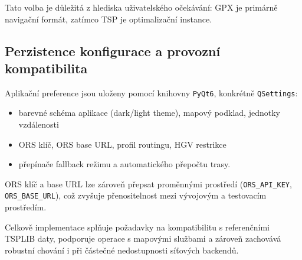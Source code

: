 Tato volba je důležitá z hlediska uživatelského očekávání: GPX je primárně navigační formát, zatímco TSP je optimalizační instance.

\subsection{Perzistence konfigurace a provozní kompatibilita}
Aplikační preference jsou uloženy pomocí knihovny \texttt{PyQt6}, konkrétně \texttt{QSettings}:
\begin{itemize}
    \item barevné schéma aplikace (dark/light theme), mapový podklad, jednotky vzdálenosti
    \item ORS klíč, ORS base URL, profil routingu, HGV restrikce
    \item přepínače fallback režimu a automatického přepočtu trasy.
\end{itemize}

ORS klíč a base URL lze zároveň přepsat proměnnými prostředí (\texttt{ORS\_API\_KEY}, \texttt{ORS\_BASE\_URL}), což zvyšuje přenositelnost mezi vývojovým a testovacím prostředím.

Celkově implementace splňuje požadavky na kompatibilitu s referenčními TSPLIB daty, podporuje operace s mapovými službami a zároveň zachovává robustní chování i při částečné nedostupnosti síťových backendů.
\endinput

